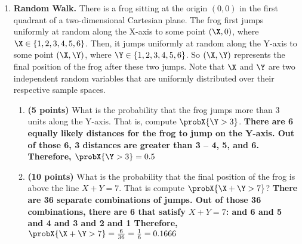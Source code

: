 \documentclass[11pt]{article}
\begin{document}
\begin{enumerate}
  \item {\bfseries Random Walk.}
  There is a frog sitting at the origin $(0,0)$ in the first quadrant of a two-dimensional Cartesian plane. The frog first jumps uniformly at random along the X-axis to some point $(\X,0)$, where $\X\in \{1,2,3,4,5,6\}$. 
  Then, it jumps uniformly at random along the Y-axis to some point $(\X,\Y)$, where $\Y \in \{1,2,3,4,5,6\}$. 
  So $(\X,\Y)$ represents the final position of the frog after these two jumps. 
  Note that $\X$ and $\Y$ are two independent random variables that are uniformly distributed over their respective sample spaces. 
  \begin{enumerate}
      \item {\bfseries (5 points)} What is the probability that the frog jumps more than 3 units along the Y-axis. That is, compute $\probX{\Y > 3}$. 
      \newline
      {\bfseries
        \newline
        \newline
        There are 6 equally likely distances for the frog to jump on the Y-axis. Out of those 6, 3 distances are greater than 3 -- 4, 5, and 6. Therefore, \newline
        $\probX{\Y > 3} = 0.5$
      }
      \vspace{0.25\textheight}
      \item {\bfseries (10 points)} What is the probability that the final position of the frog is above the line $X+Y=7$. That is compute $\probX{\X+\Y >7}$?
      \newline
      {\bfseries
        \newline
        There are 36 separate combinations of jumps. Out of those 36 combinations, there are 6 that satisfy $X+Y=7$:  and 6  and 5  and 4  and 3  and 2  and 1 \newline
        \newline
        Therefore, \newline
        $\probX{\X+\Y >7} = \frac{6}{36} = \frac{1}{6} = 0.1666$
      }
      \vspace{0.25\textheight}

\end{enumerate}
\end{enumerate}
\end{document}
